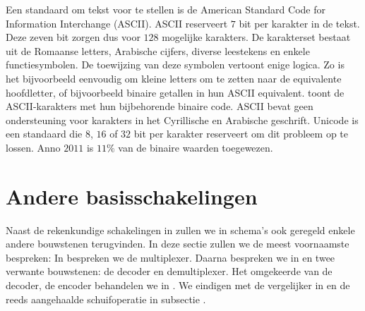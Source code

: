 Een standaard om tekst voor te stellen is de American Standard Code for Information Interchange (ASCII). ASCII reserveert $7$ bit per karakter in de tekst. Deze zeven bit zorgen dus voor $128$ mogelijke karakters. De karakterset bestaat uit de Romaanse letters, Arabische cijfers, diverse leestekens en enkele functiesymbolen. De toewijzing van deze symbolen vertoont enige logica. Zo is het bijvoorbeeld eenvoudig om kleine letters om te zetten naar de equivalente hoofdletter, of bijvoorbeeld binaire getallen in hun ASCII equivalent.  toont de ASCII-karakters met hun bijbehorende binaire code. ASCII bevat geen ondersteuning voor karakters in het Cyrillische en Arabische geschrift. Unicode is een standaard die $8$, $16$ of $32$ bit per karakter reserveert om dit probleem op te lossen. Anno $2011$ is $11\%$ van de binaire waarden toegewezen.

\section{Andere basisschakelingen}
Naast de rekenkundige schakelingen in  zullen we in schema's ook geregeld enkele andere bouwstenen terugvinden. In deze sectie zullen we de meest voornaamste bespreken: In  bespreken we de multiplexer. Daarna bespreken we in  en  twee verwante bouwstenen: de decoder en demultiplexer. Het omgekeerde van de decoder, de encoder behandelen we in . We eindigen met de vergelijker in  en de reeds aangehaalde schuifoperatie in subsectie .

